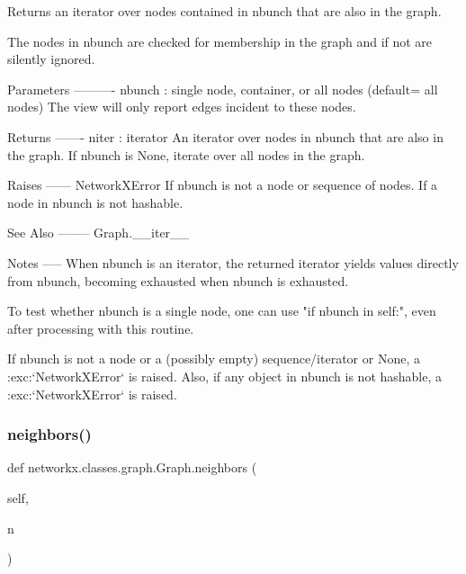 \begin{DoxyVerb}Returns an iterator over nodes contained in nbunch that are
also in the graph.

The nodes in nbunch are checked for membership in the graph
and if not are silently ignored.

Parameters
----------
nbunch : single node, container, or all nodes (default= all nodes)
    The view will only report edges incident to these nodes.

Returns
-------
niter : iterator
    An iterator over nodes in nbunch that are also in the graph.
    If nbunch is None, iterate over all nodes in the graph.

Raises
------
NetworkXError
    If nbunch is not a node or sequence of nodes.
    If a node in nbunch is not hashable.

See Also
--------
Graph.__iter__

Notes
-----
When nbunch is an iterator, the returned iterator yields values
directly from nbunch, becoming exhausted when nbunch is exhausted.

To test whether nbunch is a single node, one can use
"if nbunch in self:", even after processing with this routine.

If nbunch is not a node or a (possibly empty) sequence/iterator
or None, a :exc:`NetworkXError` is raised.  Also, if any object in
nbunch is not hashable, a :exc:`NetworkXError` is raised.
\end{DoxyVerb}
 \mbox{\label{classnetworkx_1_1classes_1_1graph_1_1Graph_ae3e67a702c31c6712f6c8205e5a246f2}} 
\subsubsection{\texorpdfstring{neighbors()}{neighbors()}}
{\footnotesize\ttfamily def networkx.\+classes.\+graph.\+Graph.\+neighbors (\begin{DoxyParamCaption}\item[{}]{self,  }\item[{}]{n }\end{DoxyParamCaption})}

